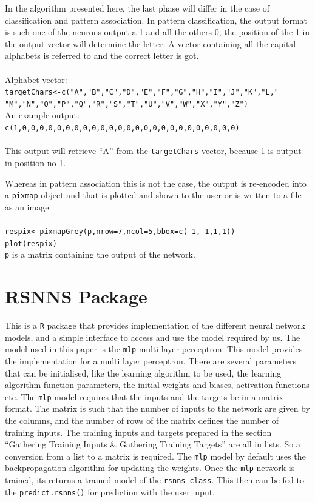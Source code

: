 \documentclass[a4paper,12pt]{report}
\begin{document}
In the algorithm presented here, the last phase will differ in the case of classification and pattern association. In pattern classification,
the output format is such one of the neurons output a 1 and all the others 0, the position of the 1 in the output vector will determine the letter.
A vector containing all the capital alphabets is referred to and the correct letter is got.\\ \\
Alphabet vector:\\
\verb+targetChars<-c("A","B","C","D","E","F","G","H","I","J","K","L,"+\\
\hspace{2pt}\verb+"M","N","O","P","Q","R","S","T","U","V","W","X","Y","Z")+\\
An example output:\\
\verb+c(1,0,0,0,0,0,0,0,0,0,0,0,0,0,0,0,0,0,0,0,0,0,0,0,0,0)+\\ \\
This output will retrieve ``A'' from the \verb+targetChars+ vector, because 1 is output in position no 1.

Whereas in pattern association this is not the case, the output is re-encoded into a \verb+pixmap+ object and that is plotted and shown to the user 
or is written to a file as an image.\\ \\
\verb+respix<-pixmapGrey(p,nrow=7,ncol=5,bbox=c(-1,-1,1,1))+\\
\verb+plot(respix)+\\
\verb+p+ is a matrix containing the output of the network. \\

\section*{RSNNS Package}
This is a \verb+R+ package that provides implementation of the different neural network models, and a simple interface to access and 
use the model required by us. The model used in this paper is the \verb+mlp+ multi-layer perceptron. This model provides the implementation
for a multi layer perceptron. There are several parameters that can be initialised, like the learning algorithm to be used, the learning algorithm function parameters,
the initial weights and biases, activation functions etc.
The \verb+mlp+ model requires that the inputs and the targets be in a matrix format. The matrix is such that the number of inputs to the network 
are given by the columns, and the number of rows of the matrix defines the number of training inputs.
The training inputs and targets prepared in the section ``Gathering Training Inputs \& Gathering Training Targets''  are all in lists.
So a conversion from a list to a matrix is required. The \verb+mlp+ model by default uses the backpropagation algorithm for updating the weights.
Once the \verb+mlp+ network is trained, its returns a trained model of the \verb+rsnns class+. This then can be fed to the 
\verb+predict.rsnns()+ for prediction with the user input.
\end{document}

